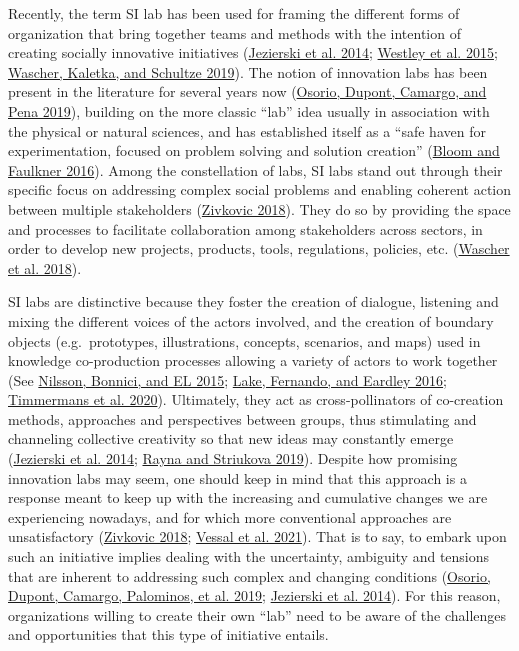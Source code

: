 \documentclass[AMA,STIX1COL,APA,STIX2COL]{WileyNJD-v2}
\begin{document}
Recently, the term SI lab has been used for framing the different forms
of organization that bring together teams and methods with the intention
of creating socially innovative initiatives
(\protect\hyperlink{ref-Jezierski2014}{Jezierski et al. 2014};
\protect\hyperlink{ref-Westley2015}{Westley et al. 2015};
\protect\hyperlink{ref-Wascher2019}{Wascher, Kaletka, and Schultze
2019}). The notion of innovation labs has been present in the literature
for several years now (\protect\hyperlink{ref-Osorio2019-A}{Osorio,
Dupont, Camargo, and Pena 2019}), building on the more classic ``lab''
idea usually in association with the physical or natural sciences, and
has established itself as a ``safe haven for experimentation, focused on
problem solving and solution creation''
(\protect\hyperlink{ref-Bloom2016}{Bloom and Faulkner 2016}). Among the
constellation of labs, SI labs stand out through their specific focus on
addressing complex social problems and enabling coherent action between
multiple stakeholders (\protect\hyperlink{ref-Zivkovic2018}{Zivkovic
2018}). They do so by providing the space and processes to facilitate
collaboration among stakeholders across sectors, in order to develop new
projects, products, tools, regulations, policies, etc.
(\protect\hyperlink{ref-Wascher2018}{Wascher et al. 2018}).

SI labs are distinctive because they foster the creation of dialogue,
listening and mixing the different voices of the actors involved, and
the creation of boundary objects (e.g.~prototypes, illustrations,
concepts, scenarios, and maps) used in knowledge co-production processes
allowing a variety of actors to work together (See
\protect\hyperlink{ref-Nilsson2015}{Nilsson, Bonnici, and EL 2015};
\protect\hyperlink{ref-Lake2016}{Lake, Fernando, and Eardley 2016};
\protect\hyperlink{ref-Timmermans2020}{Timmermans et al. 2020}).
Ultimately, they act as cross-pollinators of co-creation methods,
approaches and perspectives between groups, thus stimulating and
channeling collective creativity so that new ideas may constantly emerge
(\protect\hyperlink{ref-Jezierski2014}{Jezierski et al. 2014};
\protect\hyperlink{ref-Rayna2019}{Rayna and Striukova 2019}). Despite
how promising innovation labs may seem, one should keep in mind that
this approach is a response meant to keep up with the increasing and
cumulative changes we are experiencing nowadays, and for which more
conventional approaches are unsatisfactory
(\protect\hyperlink{ref-Zivkovic2018}{Zivkovic 2018};
\protect\hyperlink{ref-RezaeeVessal2021}{Vessal et al. 2021}). That is
to say, to embark upon such an initiative implies dealing with the
uncertainty, ambiguity and tensions that are inherent to addressing such
complex and changing conditions
(\protect\hyperlink{ref-Osorio2019}{Osorio, Dupont, Camargo, Palominos,
et al. 2019}; \protect\hyperlink{ref-Jezierski2014}{Jezierski et al.
2014}). For this reason, organizations willing to create their own
``lab'' need to be aware of the challenges and opportunities that this
type of initiative entails.
\end{document}
